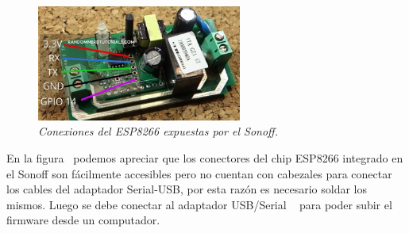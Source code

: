 \begin{figure}[h]
  \centering
  \includegraphics[width=0.6\textwidth, keepaspectratio]{images/sonoff-gpio}
  \caption{\textit{Conexiones del ESP8266 expuestas por el Sonoff.}}
  \label{fig:sonoff-gpio}
\end{figure}
En la figura~ podemos apreciar que los conectores del chip ESP8266 integrado en el Sonoff son fácilmente accesibles pero no cuentan con cabezales para conectar los cables del adaptador Serial-USB, por esta razón es necesario soldar los mismos.
Luego se debe conectar al adaptador USB/Serial ~ para poder subir el firmware desde un computador. 

